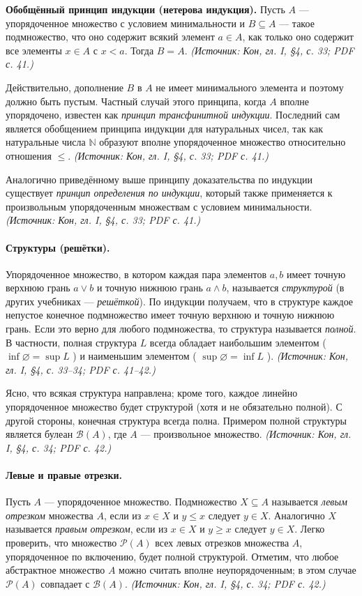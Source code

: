 \documentclass[a4paper,12pt]{article}
\begin{document}
\textbf{Обобщённый принцип индукции (нетерова индукция).} Пусть \(A\) — упорядоченное множество с условием минимальности и \(B\subseteq A\) — такое подмножество, что оно содержит всякий элемент \(a\in A\), как только оно содержит все элементы \(x\in A\) с \(x<a\). Тогда \(B=A\).
\textit{(Источник: Кон, гл. I, §4, с. 33; PDF с. 41.)}

Действительно, дополнение \(B\) в \(A\) не имеет минимального элемента и поэтому должно быть пустым. Частный случай этого принципа, когда \(A\) вполне упорядочено, известен как \emph{принцип трансфинитной индукции}. Последний сам является обобщением принципа индукции для натуральных чисел, так как натуральные числа \(\mathbb{N}\) образуют вполне упорядоченное множество относительно отношения \(\le\).
\textit{(Источник: Кон, гл. I, §4, с. 33; PDF с. 41.)}

Аналогично приведённому выше принципу доказательства по индукции существует \emph{принцип определения по индукции}, который также применяется к произвольным упорядоченным множествам с условием минимальности.
\textit{(Источник: Кон, гл. I, §4, с. 33; PDF с. 41.)}

\paragraph{Структуры (решётки).}
Упорядоченное множество, в котором каждая пара элементов \(a,b\) имеет точную верхнюю грань \(a\vee b\) и точную нижнюю грань \(a\wedge b\), называется \emph{структурой} (в других учебниках — \emph{решёткой}). По индукции получаем, что в структуре каждое непустое конечное подмножество имеет точную верхнюю и точную нижнюю грань. Если это верно для любого подмножества, то структура называется \emph{полной}. В частности, полная структура \(L\) всегда обладает наибольшим элементом ( \(\inf\varnothing=\sup L\) ) и наименьшим элементом ( \(\sup\varnothing=\inf L\) ).
\textit{(Источник: Кон, гл. I, §4, с. 33--34; PDF с. 41--42.)}

Ясно, что всякая структура направлена; кроме того, каждое линейно упорядоченное множество будет структурой (хотя и не обязательно полной). С другой стороны, конечная структура всегда полна. Примером полной структуры является булеан \(\mathcal{B}(A)\), где \(A\) — произвольное множество.
\textit{(Источник: Кон, гл. I, §4, с. 34; PDF с. 42.)}

\paragraph{Левые и правые отрезки.}
Пусть \(A\) — упорядоченное множество. Подмножество \(X\subseteq A\) называется \emph{левым отрезком} множества \(A\), если из \(x\in X\) и \(y\le x\) следует \(y\in X\). Аналогично \(X\) называется \emph{правым отрезком}, если из \(x\in X\) и \(y\ge x\) следует \(y\in X\). Легко проверить, что множество \(\mathcal{P}(A)\) всех левых отрезков множества \(A\), упорядоченное по включению, будет полной структурой. Отметим, что любое абстрактное множество \(A\) можно считать вполне неупорядоченным; в этом случае \(\mathcal{P}(A)\) совпадает с \(\mathcal{B}(A)\).
\textit{(Источник: Кон, гл. I, §4, с. 34; PDF с. 42.)}
\end{document}
